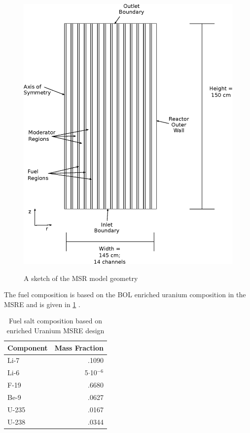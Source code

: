 \documentclass{article}
\begin{document}
\begin{figure}
  \centering
  \includegraphics{geometry.eps}
  \label{fig:geom}
  \caption{A sketch of the \gls{MSR} model geometry}
\end{figure}


The fuel composition is based on the \gls{BOL} enriched uranium composition in the \gls{MSRE}
and is given in \cref{table:comp} \cite{robertson_msre_1965}.


\begin{table}[htpb]
  \begin{center}
    \begin{tabular}{l | r}
      Component & Mass Fraction\\\hline\hline
      Li-7 & .1090\\
      Li-6 & 5$\cdot$10$^{-6}$\\
      F-19 & .6680\\
      Be-9 & .0627\\
      U-235 & .0167\\
      U-238 & .0344\\
    \end{tabular}
  \end{center}
  \caption{Fuel salt composition based on enriched Uranium \gls{MSRE} design \cite{robertson_msre_1965}}
  \label{table:comp}
\end{table}
\end{document}
